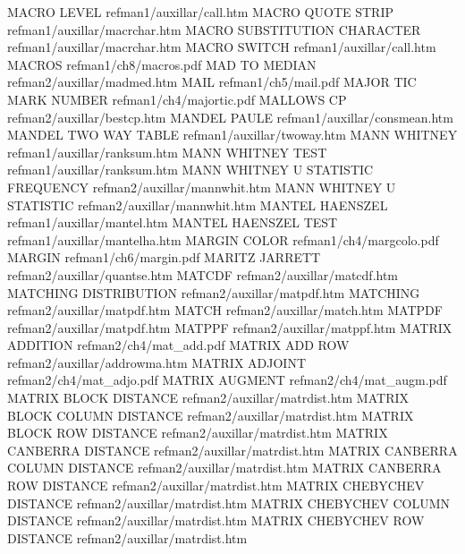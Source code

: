 MACRO LEVEL                             refman1/auxillar/call.htm
MACRO QUOTE STRIP                       refman1/auxillar/macrchar.htm
MACRO SUBSTITUTION CHARACTER            refman1/auxillar/macrchar.htm
MACRO SWITCH                            refman1/auxillar/call.htm
MACROS                                  refman1/ch8/macros.pdf
MAD TO MEDIAN                           refman2/auxillar/madmed.htm
MAIL                                    refman1/ch5/mail.pdf
MAJOR TIC MARK NUMBER                   refman1/ch4/majortic.pdf
MALLOWS CP                              refman2/auxillar/bestcp.htm
MANDEL PAULE                            refman1/auxillar/consmean.htm
MANDEL TWO WAY TABLE                    refman1/auxillar/twoway.htm
MANN WHITNEY                            refman1/auxillar/ranksum.htm
MANN WHITNEY TEST                       refman1/auxillar/ranksum.htm
MANN WHITNEY U STATISTIC FREQUENCY      refman2/auxillar/mannwhit.htm
MANN WHITNEY U STATISTIC                refman2/auxillar/mannwhit.htm
MANTEL HAENSZEL                         refman1/auxillar/mantel.htm
MANTEL HAENSZEL TEST                    refman1/auxillar/mantelha.htm
MARGIN COLOR                            refman1/ch4/margcolo.pdf
MARGIN                                  refman1/ch6/margin.pdf
MARITZ JARRETT                          refman2/auxillar/quantse.htm
MATCDF                                  refman2/auxillar/matcdf.htm
MATCHING DISTRIBUTION                   refman2/auxillar/matpdf.htm
MATCHING                                refman2/auxillar/matpdf.htm
MATCH                                   refman2/auxillar/match.htm
MATPDF                                  refman2/auxillar/matpdf.htm
MATPPF                                  refman2/auxillar/matppf.htm
MATRIX ADDITION                         refman2/ch4/mat_add.pdf
MATRIX ADD ROW                          refman2/auxillar/addrowma.htm
MATRIX ADJOINT                          refman2/ch4/mat_adjo.pdf
MATRIX AUGMENT                          refman2/ch4/mat_augm.pdf
MATRIX BLOCK DISTANCE                   refman2/auxillar/matrdist.htm
MATRIX BLOCK COLUMN DISTANCE            refman2/auxillar/matrdist.htm
MATRIX BLOCK ROW DISTANCE               refman2/auxillar/matrdist.htm
MATRIX CANBERRA DISTANCE                refman2/auxillar/matrdist.htm
MATRIX CANBERRA COLUMN DISTANCE         refman2/auxillar/matrdist.htm
MATRIX CANBERRA ROW DISTANCE            refman2/auxillar/matrdist.htm
MATRIX CHEBYCHEV DISTANCE               refman2/auxillar/matrdist.htm
MATRIX CHEBYCHEV COLUMN DISTANCE        refman2/auxillar/matrdist.htm
MATRIX CHEBYCHEV ROW DISTANCE           refman2/auxillar/matrdist.htm
